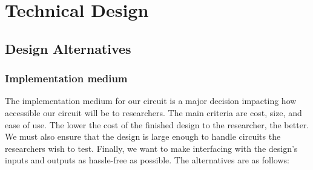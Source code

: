 \section{Technical Design}

\subsection{Design Alternatives}

% 
% 
% 

\subsubsection{Implementation medium}

The implementation medium for our circuit is a major decision impacting how accessible our circuit will be to researchers.
The main criteria are cost, size, and ease of use.
The lower the cost of the finished design to the researcher, the better.
We must also ensure that the design is large enough to handle circuits the researchers wish to test.
Finally, we want to make interfacing with the design's inputs and outputs as hassle-free as possible.
The alternatives are as follows:

